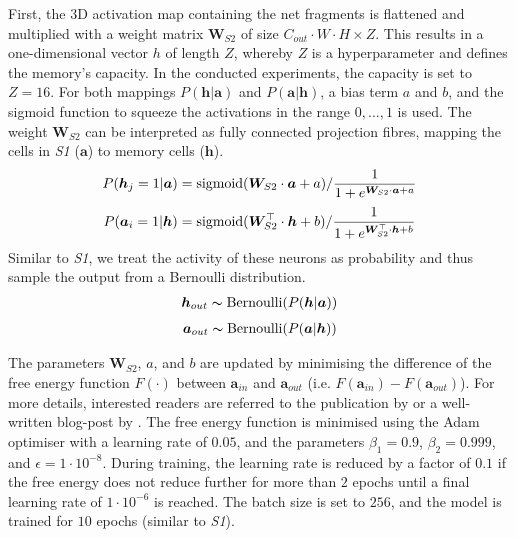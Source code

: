 First, the 3D activation map containing the net fragments is flattened and multiplied with a weight matrix $\boldsymbol{W}_{S2}$ of size $C_{out}\cdot W\cdot H \times Z$. This results in a one-dimensional vector $h$ of length $Z$, whereby $Z$ is a hyperparameter and defines the memory's capacity.
In the conducted experiments, the capacity is set to $Z=16$.
For both mappings $P(\boldsymbol{h}|\boldsymbol{a})$ and $P(\boldsymbol{a}|\boldsymbol{h})$, a bias term $a$ and $b$, and the sigmoid function to squeeze the activations in the range $0, ..., 1$ is used. 
The weight $\boldsymbol{W}_{S2}$ can be interpreted as fully connected projection fibres, mapping the cells in \emph{S1} ($\boldsymbol{a}$) to memory cells ($\boldsymbol{h}$).
\begin{align}\eqlbl{l2_1}
	P(\boldsymbol{h}_j=1 | \boldsymbol{a}) = \text{sigmoid}(\boldsymbol{W}_{S2} \cdot \boldsymbol{a} + a) / \frac{1}{1 + e^{\boldsymbol{W}_{S2} \cdot \boldsymbol{a} + a}}
\end{align}
\begin{align}\eqlbl{l2_2}
	P(\boldsymbol{a}_i=1 | \boldsymbol{h}) = \text{sigmoid}(\boldsymbol{W}_{S2}^\top \cdot \boldsymbol{h} + b) / \frac{1}{1 + e^{\boldsymbol{W}_{S2}^\top \cdot \boldsymbol{h} + b}}
\end{align}
Similar to \emph{S1}, we treat the activity of these neurons as probability and thus sample the output from a Bernoulli distribution.
\begin{align}\eqlbl{l2_3}
	\boldsymbol{h}_{out} \thicksim \text{Bernoulli}(P(\boldsymbol{h} | \boldsymbol{a}) )
\end{align}
\begin{align}\eqlbl{l2_4}
	\boldsymbol{a}_{out} \thicksim \text{Bernoulli}(P(\boldsymbol{a} | \boldsymbol{h}))
\end{align}

The parameters $\boldsymbol{W}_{S2}$, $a$, and $b$ are updated by minimising the difference of the free energy function $F(\cdot)$  between $\boldsymbol{a}_{in}$ and $\boldsymbol{a}_{out}$ (i.e. $F(\boldsymbol{a}_{in}) - F(\boldsymbol{a}_{out})$). For more details, interested readers are referred to the publication by  or a well-written blog-post by .
The free energy function is minimised using the Adam  optimiser with a learning rate of $0.05$, and the parameters $\beta_1=0.9$, $\beta_2=0.999$, and $\epsilon=1\cdot 10^{-8}$.
During training, the learning rate is reduced by a factor of $0.1$ if the free energy does not reduce further for more than $2$ epochs until a final learning rate of $1\cdot 10^{-6}$ is reached.
The batch size is set to $256$, and the model is trained for $10$ epochs (similar to \emph{S1}).

